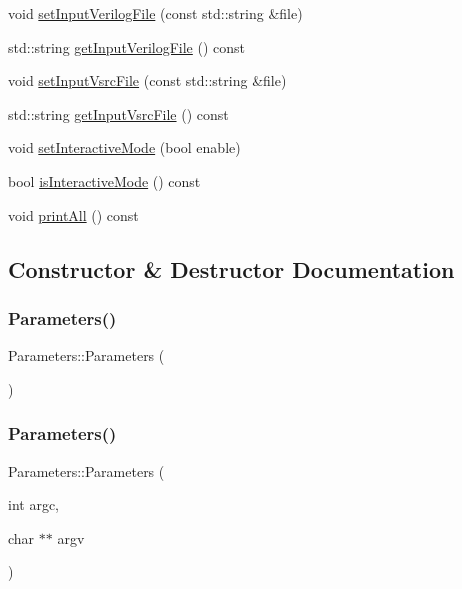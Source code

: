 \begin{DoxyCompactItemize}
$$void \hyperlink{classParameters_a110d9180f5f0d20c312845e35c11f317}{set\+Input\+Verilog\+File} (const std\+::string \&file)
\item 
std\+::string \hyperlink{classParameters_a795d6565130c76b1e9fd5df2e31f56f7}{get\+Input\+Verilog\+File} () const
\item 
void \hyperlink{classParameters_aa397a702ebe5fc0bd3345908a0dab20b}{set\+Input\+Vsrc\+File} (const std\+::string \&file)
\item 
std\+::string \hyperlink{classParameters_a3d5f373bcf526f0b4553094e75acbe3e}{get\+Input\+Vsrc\+File} () const
\item 
void \hyperlink{classParameters_aa7fa52090b8c065fa8604dbc6a708c4e}{set\+Interactive\+Mode} (bool enable)
\item 
bool \hyperlink{classParameters_aed0cd3144895a617f05efa45aaf4eeb3}{is\+Interactive\+Mode} () const
\item 
void \hyperlink{classParameters_a5a23bb11ac63e7ee5fbec2dee60c04d2}{print\+All} () const
\end{DoxyCompactItemize}


\subsection{Constructor \& Destructor Documentation}
\mbox{\label{classParameters_a1e3c72bebe6cc8a15ada7346f7e16e2a}} 
\subsubsection{\texorpdfstring{Parameters()}{Parameters()}\hspace{0.1cm}{\footnotesize\ttfamily [1/2]}}
{\footnotesize\ttfamily Parameters\+::\+Parameters (\begin{DoxyParamCaption}{ }\end{DoxyParamCaption})\hspace{0.3cm}{\ttfamily [default]}}

\mbox{\label{classParameters_a4eb634bd1e0e8d43b62d987babd7515a}} 
\subsubsection{\texorpdfstring{Parameters()}{Parameters()}\hspace{0.1cm}{\footnotesize\ttfamily [2/2]}}
{\footnotesize\ttfamily Parameters\+::\+Parameters (\begin{DoxyParamCaption}\item[{int}]{argc,  }\item[{char $\ast$$\ast$}]{argv }\end{DoxyParamCaption})}




